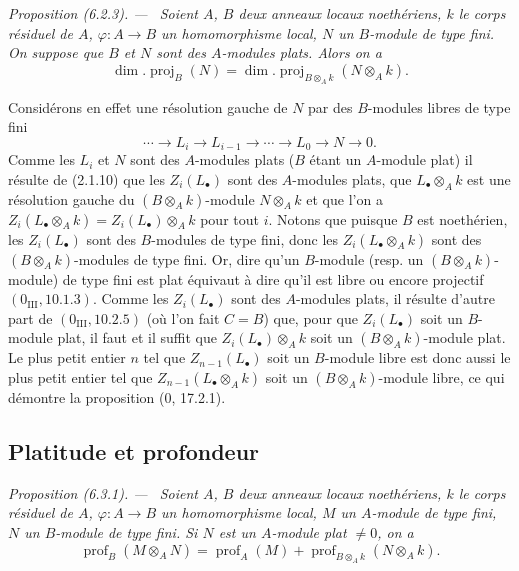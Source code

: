 \documentclass[10pt,oneside]{book}
\makeatletter
\newcommand{\oldpage}[2][]{%
  \setcounter{footnote}{0}%
  \marginpar{\scriptsize\textbf{#1}~|~#2}\ignorespaces}
\newenvironment{proposition}[1][]{%
  \par\medskip\noindent\itshape Proposition (#1). ---\ }{\par}
\newcommand{\EGAReaderTarget}[2]{\hypertarget{#1}{}\@bsphack\begingroup\def\@currentHref{#1}\label{#2}\endgroup\@esphack}
\makeatother
\begin{document}
\oldpage[IV-2]{138}

\begin{proposition}[6.2.3]
\EGAReaderTarget{ega4.c04.prop.6-2-3}{IV.2.s6.2.3-fr}
Soient $A$, $B$ deux anneaux locaux noethériens, $k$ le corps résiduel de
$A$, $\varphi:A\to B$ un homomorphisme local, $N$ un $B$-module de type fini.
On suppose que $B$ et $N$ sont des $A$-modules plats. Alors on a
\begin{equation}
\dim.\operatorname{proj}_B(N)
=\dim.\operatorname{proj}_{B\otimes_Ak}(N\otimes_Ak).
\tag{6.2.3.1}\label{IV.2.s6.2.3.1-fr}
\end{equation}
\end{proposition}

Considérons en effet une résolution gauche de $N$ par des $B$-modules libres
de type fini
\[
\cdots\to L_i\to L_{i-1}\to\cdots\to L_0\to N\to0.
\]
Comme les $L_i$ et $N$ sont des $A$-modules plats ($B$ étant un $A$-module
plat) il résulte de (2.1.10) que les $Z_i(L_\bullet)$ sont des $A$-modules
plats, que $L_\bullet\otimes_Ak$ est une résolution gauche du
$(B\otimes_Ak)$-module $N\otimes_Ak$ et que l'on a
$Z_i(L_\bullet\otimes_Ak)=Z_i(L_\bullet)\otimes_Ak$ pour tout $i$. Notons que
puisque $B$ est noethérien, les $Z_i(L_\bullet)$ sont des $B$-modules de type
fini, donc les $Z_i(L_\bullet\otimes_Ak)$ sont des $(B\otimes_Ak)$-modules de
type fini. Or, dire qu'un $B$-module (resp. un $(B\otimes_Ak)$-module) de type
fini est plat équivaut à dire qu'il est libre ou encore projectif
$(0_{\mathrm{III}}, 10.1.3)$. Comme les $Z_i(L_\bullet)$ sont des $A$-modules
plats, il résulte d'autre part de $(0_{\mathrm{III}}, 10.2.5)$ (où l'on fait
$C=B$) que, pour que $Z_i(L_\bullet)$ soit un $B$-module plat, il faut et il
suffit que $Z_i(L_\bullet)\otimes_Ak$ soit un $(B\otimes_Ak)$-module plat. Le
plus petit entier $n$ tel que $Z_{n-1}(L_\bullet)$ soit un $B$-module libre est
donc aussi le plus petit entier tel que $Z_{n-1}(L_\bullet\otimes_Ak)$ soit un
$(B\otimes_Ak)$-module libre, ce qui démontre la proposition (0, 17.2.1).

\subsection{Platitude et profondeur}

\begin{proposition}[6.3.1]
\EGAReaderTarget{ega4.c04.prop.6-3-1}{IV.2.s6.3.1-fr}
Soient $A$, $B$ deux anneaux locaux noethériens, $k$ le corps résiduel de
$A$, $\varphi:A\to B$ un homomorphisme local, $M$ un $A$-module de type fini,
$N$ un $B$-module de type fini. Si $N$ est un $A$-module plat $\neq0$, on a
\begin{equation}
\operatorname{prof}_B(M\otimes_AN)=\operatorname{prof}_A(M)
+\operatorname{prof}_{B\otimes_Ak}(N\otimes_Ak).
\tag{6.3.1.1}\label{IV.2.s6.3.1.1-fr}
\end{equation}
\end{proposition}
\end{document}
